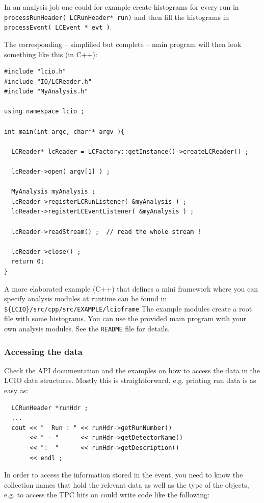 \documentclass[twoside]{article}
\begin{document}
In an analysis job one could for example create histograms for every run in \\
\verb$processRunHeader( LCRunHeader* run)$
and then fill the histograms in \verb$processEvent( LCEvent * evt )$.

The corresponding -- simplified but complete -- main program will then look something 
like this (in C++):

\begin{verbatim}
#include "lcio.h"
#include "IO/LCReader.h"
#include "MyAnalysis.h"

using namespace lcio ;

int main(int argc, char** argv ){

  LCReader* lcReader = LCFactory::getInstance()->createLCReader() ;
  
  lcReader->open( argv[1] ) ;

  MyAnalysis myAnalysis ;
  lcReader->registerLCRunListener( &myAnalysis ) ;
  lcReader->registerLCEventListener( &myAnalysis ) ;

  lcReader->readStream() ;  // read the whole stream !

  lcReader->close() ;
  return 0;
}
\end{verbatim}

A more elaborated example (C++) that defines a mini framework where you can specify analysis modules at 
runtime can be found in \verb|${LCIO}/src/cpp/src/EXAMPLE/lcioframe| %
The example modules create a root~\cite{ref_root} file with some histograms. 
You can use the provided main program with your own 
analysis modules. See the \verb$README$ file for details.


\subsubsection{Accessing the data}
Check the API documentation and the examples on how to access the data in the LCIO data structures.
Mostly this is straightforward, e.g. printing run data is as easy as:

\begin{verbatim}
  LCRunHeader *runHdr ;
  ...  
  cout << "  Run : " << runHdr->getRunNumber() 
       << " - "      << runHdr->getDetectorName() 
       << ":  "      << runHdr->getDescription()  
       << endl ;
\end{verbatim}

In order to access the information stored in the event, you need to know the collection names that 
hold the relevant data as well as the type of the objects, e.g. to access the TPC hits on could 
write code like the following:
\end{document}
